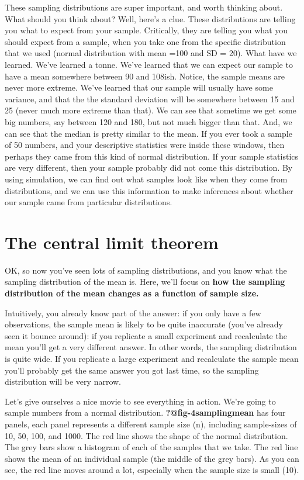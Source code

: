 \documentclass[
  letterpaper,
  DIV=11,
  numbers=noendperiod]{scrreprt}
\begin{document}
These sampling distributions are super important, and worth thinking
about. What should you think about? Well, here's a clue. These
distributions are telling you what to expect from your sample.
Critically, they are telling you what you should expect from a sample,
when you take one from the specific distribution that we used (normal
distribution with mean =100 and SD = 20). What have we learned. We've
learned a tonne. We've learned that we can expect our sample to have a
mean somewhere between 90 and 108ish. Notice, the sample means are never
more extreme. We've learned that our sample will usually have some
variance, and that the the standard deviation will be somewhere between
15 and 25 (never much more extreme than that). We can see that sometime
we get some big numbers, say between 120 and 180, but not much bigger
than that. And, we can see that the median is pretty similar to the
mean. If you ever took a sample of 50 numbers, and your descriptive
statistics were inside these windows, then perhaps they came from this
kind of normal distribution. If your sample statistics are very
different, then your sample probably did not come this distribution. By
using simulation, we can find out what samples look like when they come
from distributions, and we can use this information to make inferences
about whether our sample came from particular distributions.

\section{The central limit theorem}\label{the-central-limit-theorem}

OK, so now you've seen lots of sampling distributions, and you know what
the sampling distribution of the mean is. Here, we'll focus on
\textbf{how the sampling distribution of the mean changes as a function
of sample size.}

Intuitively, you already know part of the answer: if you only have a few
observations, the sample mean is likely to be quite inaccurate (you've
already seen it bounce around): if you replicate a small experiment and
recalculate the mean you'll get a very different answer. In other words,
the sampling distribution is quite wide. If you replicate a large
experiment and recalculate the sample mean you'll probably get the same
answer you got last time, so the sampling distribution will be very
narrow.

Let's give ourselves a nice movie to see everything in action. We're
going to sample numbers from a normal distribution.
\textbf{?@fig-4samplingmean} has four panels, each panel represents a
different sample size (n), including sample-sizes of 10, 50, 100, and
1000. The red line shows the shape of the normal distribution. The grey
bars show a histogram of each of the samples that we take. The red line
shows the mean of an individual sample (the middle of the grey bars). As
you can see, the red line moves around a lot, especially when the sample
size is small (10).
\end{document}
